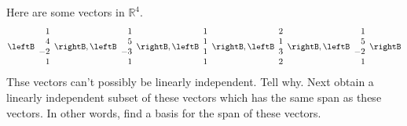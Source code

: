 \begin{enumialphparenastyle}
\begin{ex} Here are some vectors in $\mathbb{R}^{4}$. 
\begin{equation*}
\leftB 
\begin{array}{r}
1 \\ 
4 \\ 
-2 \\ 
1
\end{array}
\rightB ,\leftB 
\begin{array}{r}
1 \\ 
5 \\ 
-3 \\ 
1
\end{array}
\rightB ,\leftB 
\begin{array}{r}
1 \\ 
1 \\ 
1 \\ 
1
\end{array}
\rightB ,\leftB 
\begin{array}{r}
2 \\ 
1 \\ 
3 \\ 
2
\end{array}
\rightB ,\leftB 
\begin{array}{r}
1 \\ 
5 \\ 
-2 \\ 
1
\end{array}
\rightB
\end{equation*}
Thse vectors can't possibly be linearly independent. Tell why. Next obtain a
linearly independent subset of these vectors which has the same span as
these vectors. In other words, find a basis for the span of these vectors.
\end{ex}


\end{enumialphparenastyle}
